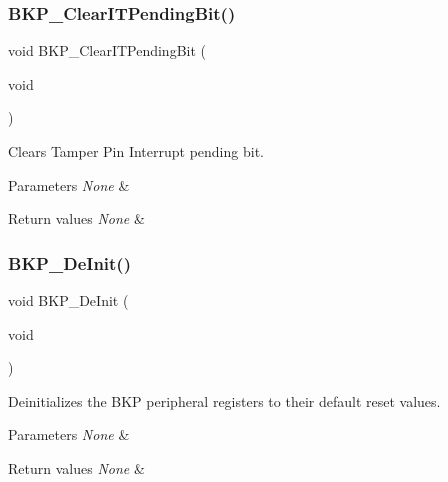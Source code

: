 \subsubsection{\texorpdfstring{BKP\_ClearITPendingBit()}{BKP\_ClearITPendingBit()}}
{\footnotesize\ttfamily void B\+K\+P\+\_\+\+Clear\+I\+T\+Pending\+Bit (\begin{DoxyParamCaption}\item[{void}]{ }\end{DoxyParamCaption})}



Clears Tamper Pin Interrupt pending bit. 


\begin{DoxyParams}{Parameters}
{\em None} & \\
\hline
\end{DoxyParams}

\begin{DoxyRetVals}{Return values}
{\em None} & \\
\hline
\end{DoxyRetVals}
\mbox{\label{group___b_k_p___private___functions_gaabff4d8f5ebf4fd9a840bcc9042ca226}} 
\subsubsection{\texorpdfstring{BKP\_DeInit()}{BKP\_DeInit()}}
{\footnotesize\ttfamily void B\+K\+P\+\_\+\+De\+Init (\begin{DoxyParamCaption}\item[{void}]{ }\end{DoxyParamCaption})}



Deinitializes the B\+KP peripheral registers to their default reset values. 


\begin{DoxyParams}{Parameters}
{\em None} & \\
\hline
\end{DoxyParams}

\begin{DoxyRetVals}{Return values}
{\em None} & \\
\hline
\end{DoxyRetVals}
\mbox{\label{group___b_k_p___private___functions_gacc9aedde760383f0bd146f0d77a547db}} 
